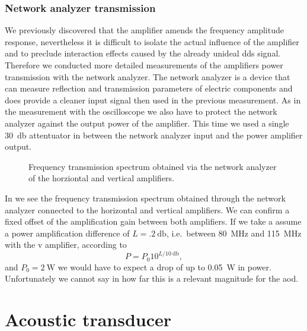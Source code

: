 \subsubsection{Network analyzer transmission}

We previously discovered that the amplifier amends the frequency amplitude
response, nevertheless it is difficult to isolate the actual influence of
the amplifier and to preclude interaction effects caused by the already
unideal \gls{dds} signal. Therefore we conducted more detailed measurements
of the amplifiers power transmission with the network analyzer. The network
analyzer is a device that can measure reflection and transmission parameters
of electric components and does provide a cleaner input signal then used in
the previous measurement. As in the measurement with the oscilloscope we also
have to protect the network analyzer against the output power of the
amplifier. This time we used a single \SI{30}{\decibel} attentuator in between
the network analyzer input and the power amplifier output.
\begin{figure}[htb]
  \centering
  \begin{adjustbox}{width=\textwidth}
    
  \end{adjustbox}
  \caption{Frequency transmission spectrum obtained via the network analyzer
    of the horziontal and vertical amplifiers.
  }\label{fig:signal_amplification_spectrum}
\end{figure}
In  we see the frequency transmission
spectrum obtained through the network analyzer connected to the horizontal
and vertical amplifiers. We can confirm a fixed offset of the amplification
gain between both amplifiers. If we take a assume a power amplification
difference of $L=\SI{.2}{\decibel}$, i.e.\ between \SI{80}{\mega\hertz} and
\SI{115}{\mega\hertz} with the \gls{v} amplifier, according to
\begin{equation}
  P
  =
  P_0 10^{L/\SI{10}{\decibel}}
  \label{eq:power_gain_decibel},
\end{equation}
and $P_0=\SI{2}{\watt}$ we would have to expect a drop of up to
\SI{.05}{\watt} in power. Unfortunately we cannot say in how far this is
a relevant magnitude for the \gls{aod}.

\section{Acoustic transducer}

